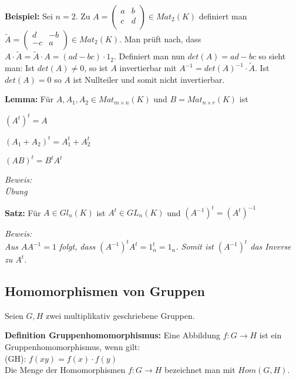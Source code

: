 \documentclass[11pt]{article}
\begin{document}
		\textbf{Beispiel:} Sei $n=2$. Zu $A=\begin{pmatrix}a & b\\c & d\\\end{pmatrix} \in Mat_2(K)$ definiert man $\tilde A=
		\begin{pmatrix}d & -b\\-c & a\\\end{pmatrix}\in Mat_2(K)$. Man prüft nach, dass $A\cdot \tilde A=\tilde A\cdot A=
		(ad-bc)\cdot 1_2$. Definiert man nun $det(A)=ad-bc$ so sieht man: Ist $det(A)\neq 0$, so ist $A$ invertierbar mit 
		$A^{-1}=det(A)^{-1}\cdot \tilde A$. Ist $det(A)=0$ so $A$ ist Nullteiler und somit nicht invertierbar. \\
		
		\begin{framed}
			\textbf{Lemma:} Für $A,A_1,A_2\in Mat_{m\times n}(K)$ und $B=Mat_{n\times r}(K)$ ist 
			\begin{compactitem}
				\item $(A^t)^t=A$
				\item $(A_1+A_2)^t=A_1^t + A_2^t$
				\item $(AB)^t=B^tA^t$
			\end{compactitem}
		\end{framed}
		\textit{Beweis: \\
		Übung} \\
		
		\begin{framed}
			\textbf{Satz:} Für $A\in Gl_n(K)$ ist $A^t\in GL_n(K)$ und $(A^{-1})^t = (A^t)^{-1}$
		\end{framed}
		\textit{Beweis: \\
		Aus $AA^{-1}=1$ folgt, dass $(A^{-1})^tA^t=1_n^t=1_n$. Somit ist $(A^{-1})^t$ das Inverse zu $A^t$.} \\
	
	\subsection{Homomorphismen von Gruppen}
		Seien $G,H$ zwei multiplikativ geschriebene Gruppen. \\
		
		\begin{mdframed}[backgroundcolor=blue!20]
			\textbf{Definition Gruppenhomomorphismus:} Eine Abbildung $f: G \to H$ ist ein Gruppenhomomorphismus, wenn gilt: \\
			(GH): $f(xy)=f(x)\cdot f(y)$ \\
			Die Menge der Homomorphismen $f:G\to H$ bezeichnet man mit $Hom(G,H)$.
		\end{mdframed}
		
\end{document}
